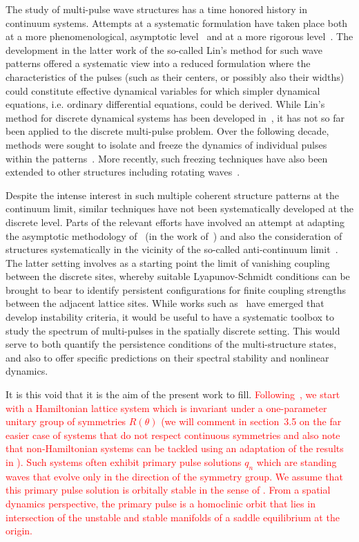 \documentclass[12pt]{elsarticle}
\newcommand{\revised}[1]{ \textcolor{red}{#1} }
\begin{document}
The study of multi-pulse wave structures has a time honored history in continuum systems. Attempts at a systematic formulation have taken place both at a more phenomenological, asymptotic level~\cite{elphick} and at a more rigorous level~\cite{Sandstede1998}. The development in the latter work of the so-called Lin's method for such wave patterns offered a systematic view into a reduced formulation where the characteristics of the pulses (such as their centers, or possibly also their widths) could constitute effective
dynamical variables for which simpler dynamical equations, i.e. ordinary differential equations, could be derived. While Lin's method for discrete dynamical systems has been developed in~\cite{Knobloch2000}, it has not so far been applied to the discrete multi-pulse problem. Over the following decade, methods were sought to 
isolate and freeze the dynamics of individual pulses within the patterns~\cite{beyn1,beyn2}. More recently, such freezing techniques have also been extended to other structures including rotating waves~\cite{beyn3}. 

Despite the intense interest in such multiple coherent structure patterns at the continuum limit, similar techniques have not been systematically developed at the discrete level. Parts of the relevant efforts have involved an attempt at adapting the asymptotic methodology of~\cite{elphick} (in the work of~\cite{kevold}) and also the consideration of structures systematically in the vicinity of the so-called anti-continuum limit~\cite{Pelinovsky2005}.
The latter setting involves as a starting point the limit of vanishing coupling between the discrete sites, whereby suitable Lyapunov-Schmidt conditions can be brought to bear to identify persistent configurations for finite coupling strengths between the adjacent lattice sites. While works such as~\cite{Kapitula2001a}
have emerged that develop instability criteria, it would be useful to have a systematic toolbox to study the spectrum of multi-pulses in the spatially discrete setting. This would serve to both quantify the persistence conditions of the multi-structure states, and also to offer specific predictions on their spectral stability and nonlinear dynamics. 

It is this void that it is the aim of the present work to fill. \revised{Following~\cite{Grillakis1987}, we start with a Hamiltonian lattice system which is invariant under a one-parameter unitary group of symmetries $R(\theta)$ (we will comment in section~3.5 on the far easier case of systems that do not respect continuous symmetries and also note that non-Hamiltonian systems can be tackled using an adaptation of the results in \cite{Sandstede1998}). Such systems often exhibit primary pulse solutions $q_n$ which are standing waves that evolve only in the direction of the symmetry group. We assume that this primary pulse solution is orbitally stable in the sense of \cite{Grillakis1987}. From a spatial dynamics perspective, the primary pulse is a homoclinic orbit that lies in intersection of the unstable and stable manifolds of a saddle equilibrium at the origin.}
\end{document}

